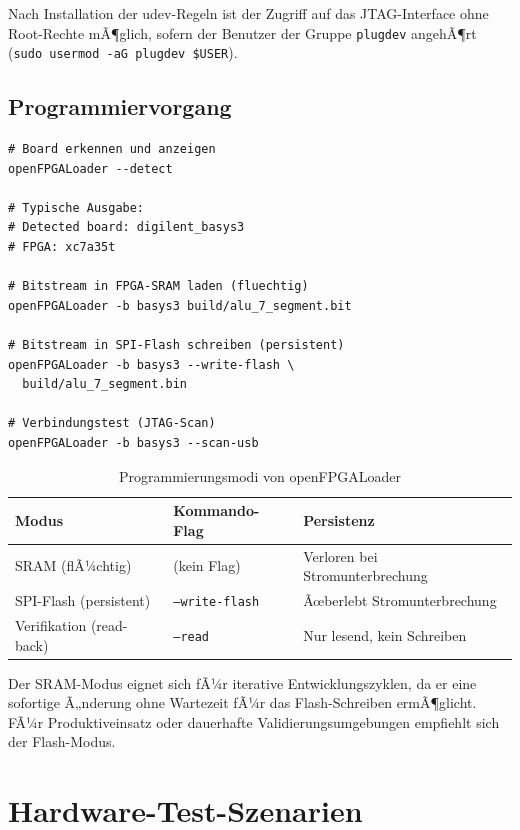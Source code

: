 ﻿\documentclass[12pt,a4paper]{report}
\begin{document}
Nach Installation der udev-Regeln ist der Zugriff auf das JTAG-Interface ohne Root-Rechte mÃ¶glich, sofern der Benutzer der Gruppe \texttt{plugdev} angehÃ¶rt (\texttt{sudo usermod -aG plugdev \$USER}).

\subsection{Programmiervorgang}
\label{subsec:programmiervorgang}

\begin{lstlisting}[style=bashstyle, caption={FPGA-Programmierung mit openFPGALoader}]
# Board erkennen und anzeigen
openFPGALoader --detect

# Typische Ausgabe:
# Detected board: digilent_basys3
# FPGA: xc7a35t

# Bitstream in FPGA-SRAM laden (fluechtig)
openFPGALoader -b basys3 build/alu_7_segment.bit

# Bitstream in SPI-Flash schreiben (persistent)
openFPGALoader -b basys3 --write-flash \
  build/alu_7_segment.bin

# Verbindungstest (JTAG-Scan)
openFPGALoader -b basys3 --scan-usb
\end{lstlisting}

\begin{table}[H]
\centering
\begin{tabular}{|l|l|l|}
\hline
\textbf{Modus} & \textbf{Kommando-Flag} & \textbf{Persistenz} \\
\hline
SRAM (flÃ¼chtig) & (kein Flag) & Verloren bei Stromunterbrechung \\
SPI-Flash (persistent) & \texttt{--write-flash} & Ãœberlebt Stromunterbrechung \\
Verifikation (read-back) & \texttt{--read} & Nur lesend, kein Schreiben \\
\hline
\end{tabular}
\caption{Programmierungsmodi von openFPGALoader}
\label{tab:openfpgaloader_modes}
\end{table}

Der SRAM-Modus eignet sich fÃ¼r iterative Entwicklungszyklen, da er eine sofortige Ã„nderung ohne Wartezeit fÃ¼r das Flash-Schreiben ermÃ¶glicht. FÃ¼r Produktiveinsatz oder dauerhafte Validierungsumgebungen empfiehlt sich der Flash-Modus.

\section{Hardware-Test-Szenarien}
\label{sec:hardware_tests}
\end{document}
